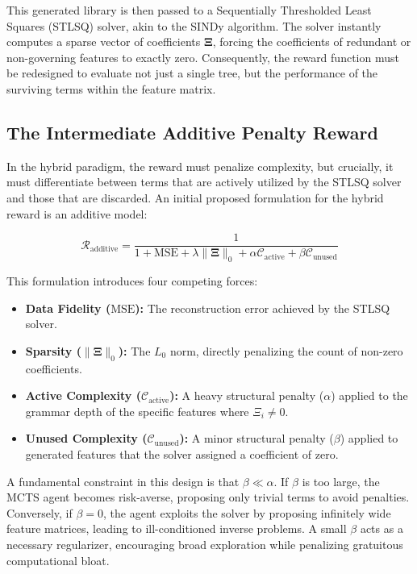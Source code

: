 \documentclass[11pt,a4paper]{article}
\begin{document}
This generated library is then passed to a Sequentially Thresholded Least Squares (STLSQ) solver, akin to the SINDy algorithm. The solver instantly computes a sparse vector of coefficients $\mathbf{\Xi}$, forcing the coefficients of redundant or non-governing features to exactly zero. Consequently, the reward function must be redesigned to evaluate not just a single tree, but the performance of the surviving terms within the feature matrix.

\subsection{The Intermediate Additive Penalty Reward}
In the hybrid paradigm, the reward must penalize complexity, but crucially, it must differentiate between terms that are actively utilized by the STLSQ solver and those that are discarded. An initial proposed formulation for the hybrid reward is an additive model:

\begin{equation}
    \mathcal{R}_{\text{additive}} = \frac{1}{1 + \text{MSE} + \lambda \|\mathbf{\Xi}\|_0 + \alpha \mathcal{C}_{\text{active}} + \beta \mathcal{C}_{\text{unused}}}
\end{equation}

This formulation introduces four competing forces:
\begin{itemize}
    \item \textbf{Data Fidelity ($\text{MSE}$):} The reconstruction error achieved by the STLSQ solver.
    \item \textbf{Sparsity ($\|\mathbf{\Xi}\|_0$):} The $L_0$ norm, directly penalizing the count of non-zero coefficients.
    \item \textbf{Active Complexity ($\mathcal{C}_{\text{active}}$):} A heavy structural penalty ($\alpha$) applied to the grammar depth of the specific features where $\Xi_i \neq 0$.
    \item \textbf{Unused Complexity ($\mathcal{C}_{\text{unused}}$):} A minor structural penalty ($\beta$) applied to generated features that the solver assigned a coefficient of zero.
\end{itemize}

A fundamental constraint in this design is that $\beta \ll \alpha$. If $\beta$ is too large, the MCTS agent becomes risk-averse, proposing only trivial terms to avoid penalties. Conversely, if $\beta = 0$, the agent exploits the solver by proposing infinitely wide feature matrices, leading to ill-conditioned inverse problems. A small $\beta$ acts as a necessary regularizer, encouraging broad exploration while penalizing gratuitous computational bloat.
\end{document}
